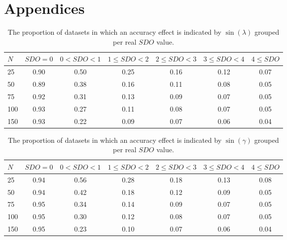 \documentclass[]{interact}
\begin{document}






\section{Appendices}

\appendix

\begin{table}[ht]
\centering
\caption{The proportion of datasets in which an accuracy effect is indicated by $\sin(\lambda)$ grouped per real $SDO$ value.} 
\begin{tabular}{lcccccc}
  \noalign{\smallskip}\hline\noalign{\smallskip}
$N$ & $SDO = 0$ & $ 0 < SDO < 1$ & $1 \leq SDO < 2$ & $2 \leq SDO < 3$ &  $3 \leq SDO < 4$ & $4 \leq SDO$\\ \hline\noalign{\smallskip}
25 & 0.90 & 0.50 & 0.25 & 0.16 & 0.12 & 0.07\\
50 & 0.89 & 0.38 & 0.16 & 0.11 & 0.08 & 0.05\\
75 & 0.92 & 0.31 & 0.13 & 0.09 & 0.07 & 0.05\\
100& 0.93 & 0.27 & 0.11 & 0.08 & 0.07 & 0.05\\
150& 0.93 & 0.22 & 0.09 & 0.07 & 0.06 & 0.04\\
   \hline
\end{tabular}
\label{TableResdetmin}
\end{table}

\begin{table}[ht]
\centering
\caption{The proportion of datasets in which an accuracy effect is indicated by $\sin(\gamma)$ grouped per real $SDO$ value.} 
\begin{tabular}{lcccccc}
  \noalign{\smallskip}\hline\noalign{\smallskip}
$N$ & $SDO = 0$ & $ 0 < SDO < 1$ & $1 \leq SDO < 2$ & $2 \leq SDO < 3$ &  $3 \leq SDO < 4$ & $4 \leq SDO$\\ \hline\noalign{\smallskip}
25 & 0.94 & 0.56 & 0.28 & 0.18 & 0.13 & 0.08 \\
50 & 0.94 & 0.42 & 0.18 & 0.12 & 0.09 & 0.05 \\
75 & 0.95 & 0.34 & 0.14 & 0.09 & 0.07 & 0.05 \\
100& 0.95 & 0.30 & 0.12 & 0.08 & 0.07 & 0.05 \\
150& 0.95 & 0.23 & 0.10 & 0.07 & 0.06 & 0.04 \\
   \hline
\end{tabular}
\label{TableResdetmax}
\end{table}
\end{document}
